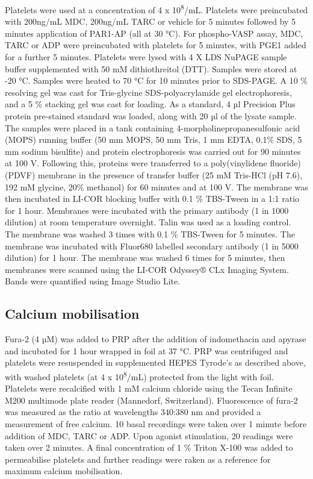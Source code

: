 \documentclass[11pt,twoside]{bristolthesis}
\begin{document}
Platelets were used at a concentration of 4 x 10\textsuperscript{8}/mL. Platelets were preincubated with 200ng/mL MDC, 200ng/mL TARC or vehicle for 5 minutes followed by 5 minutes application of PAR1-AP (all at 30 °C). For phospho-VASP assay, MDC, TARC or ADP were preincubated with platelets for 5 minutes, with PGE1 added for a further 5 minutes. Platelets were lysed with 4 X LDS NuPAGE sample buffer supplemented with 50 mM dithiothreitol (DTT). Samples were stored at -20 °C. Samples were heated to 70 °C for 10 minutes prior to SDS-PAGE. A 10 \% resolving gel was cast for Tris-glycine SDS-polyacrylamide gel electrophoresis, and a 5 \% stacking gel was cast for loading. As a standard, 4 µl Precision Plus protein pre-stained standard was loaded, along with 20 µl of the lysate sample. The samples were placed in a tank containing 4-morpholinepropanesulfonic acid (MOPS) running buffer (50 mm MOPS, 50 mm Tris, 1 mm EDTA, 0.1\% SDS, 5 mm sodium bisulfite) and protein electrophoresis was carried out for 90 minutes at 100 V. Following this, proteins were transferred to a poly(vinylidene fluoride) (PDVF) membrane in the presence of transfer buffer (25 mM Tris-HCl (pH 7.6), 192 mM glycine, 20\% methanol) for 60 minutes and at 100 V. The membrane was then incubated in LI-COR blocking buffer with 0.1 \% TBS-Tween in a 1:1 ratio for 1 hour. Membranes were incubated with the primary antibody (1 in 1000 dilution) at room temperature overnight. Talin was used as a loading control. The membrane was washed 3 times with 0.1 \% TBS-Tween for 5 minutes. The membrane was incubated with Fluor680 labelled secondary antibody (1 in 5000 dilution) for 1 hour. The membrane was washed 6 times for 5 minutes, then membranes were scanned using the LI-COR Odyssey® CLx Imaging System. Bands were quantified using Image Studio Lite.

\hypertarget{calcium-mobilisation}{%
\subsection{Calcium mobilisation}\label{calcium-mobilisation}}

Fura-2 (4 µM) was added to PRP after the addition of indomethacin and apyrase and incubated for 1 hour wrapped in foil at 37 °C. PRP was centrifuged and platelets were resuspended in supplemented HEPES Tyrode's as described above, with washed platelets (at 4 x 10\textsuperscript{8}/mL) protected from the light with foil. Platelets were recalcified with 1 mM calcium chloride using the Tecan Infinite M200 multimode plate reader (Mannedorf, Switzerland). Fluorescence of fura-2 was measured as the ratio at wavelengths 340:380 nm and provided a measurement of free calcium. 10 basal recordings were taken over 1 minute before addition of MDC, TARC or ADP. Upon agonist stimulation, 20 readings were taken over 2 minutes. A final concentration of 1 \% Triton X-100 was added to permeabilise platelets and further readings were raken as a reference for maximum calcium mobilisation.
\end{document}
